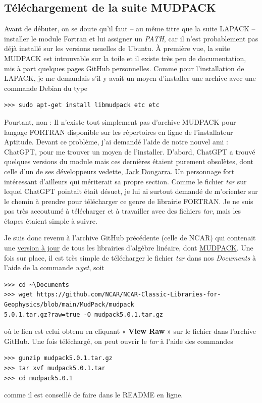\documentclass[10pt]{article}
\numberwithin{equation}{section}
\begin{document}
\subsection{Téléchargement de la suite MUDPACK}
\label{sec:org981d9c0}
Avant de débuter, on se doute qu'il faut -- au même titre que la suite LAPACK -- installer le module Fortran et lui assigner un \emph{PATH}, car il n'est probablement pas déjà installé sur les versions usuelles de Ubuntu.
À première vue, la suite MUDPACK est introuvable sur la toile et il existe très peu de documentation, mis à part quelques pages GitHub personnelles.
Comme pour l'installation de LAPACK, je me demandais s'il y avait un moyen d'installer une archive avec une commande Debian du type
\begin{verbatim}
>>> sudo apt-get install libmudpack etc etc
\end{verbatim}
Pourtant, non : Il n'existe tout simplement pas d'archive MUDPACK pour langage FORTRAN disponible sur les répertoires en ligne de l'installateur Aptitude.
Devant ce problème, j'ai demandé l'aide de notre nouvel ami : ChatGPT,  pour me trouver un moyen de l'installer.
D'abord, ChatGPT a trouvé quelques versions du module mais ces dernières étaient purement obsolètes, dont celle d'un de ses développeurs vedette, \href{https://netlib.org/utk/people/JackDongarra/}{Jack Dongarra}.
Un personnage fort intéressant d'ailleurs qui mériterait sa propre section.
Comme le fichier \emph{tar} sur lequel ChatGPT pointait était désuet, je lui ai surtout demandé de m'orienter sur le chemin à prendre pour télécharger ce genre de librairie FORTRAN.
Je ne suis pas très accoutumé à télécharger et à travailler avec des fichiers \emph{tar}, mais les étapes étaient simple à suivre.\newline

Je suis donc revenu à l'archive GitHub précédente (celle de NCAR) qui contenait une \href{https://github.com/NCAR/NCAR-Classic-Libraries-for-Geophysics}{version à jour}  de tous les librairies d'algèbre linéaire, dont \href{https://github.com/NCAR/NCAR-Classic-Libraries-for-Geophysics/tree/main/MudPack}{MUDPACK}.
Une fois sur place, il est très simple de télécharger le fichier \emph{tar} dans nos \emph{Documents} à l'aide de la commande \emph{wget}, soit
\begin{verbatim}
>>> cd ~\Documents
>>> wget https://github.com/NCAR/NCAR-Classic-Libraries-for-Geophysics/blob/main/MudPack/mudpack
5.0.1.tar.gz?raw=true -O mudpack5.0.1.tar.gz
\end{verbatim}
où le lien est celui obtenu en cliquant « \textbf{View Raw} » sur le fichier dans l'archive GitHub.
Une fois téléchargé, on peut ouvrir le \emph{tar} à l'aide des commandes
\begin{verbatim}
>>> gunzip mudpack5.0.1.tar.gz
>>> tar xvf mudpack5.0.1.tar
>>> cd mudpack5.0.1
\end{verbatim}
comme il est conseillé de faire dans le README en ligne.
\end{document}
